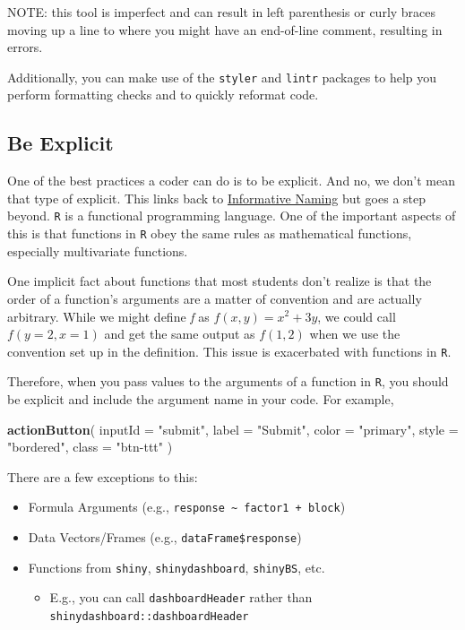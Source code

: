 \documentclass[
]{book}
\newenvironment{Shaded}{\begin{snugshade}}{\end{snugshade}}
\newcommand{\DataTypeTok}[1]{\textcolor[rgb]{0.13,0.29,0.53}{#1}}
\newcommand{\KeywordTok}[1]{\textcolor[rgb]{0.13,0.29,0.53}{\textbf{#1}}}
\newcommand{\NormalTok}[1]{#1}
\newcommand{\StringTok}[1]{\textcolor[rgb]{0.31,0.60,0.02}{#1}}
\providecommand{\tightlist}{%
  \setlength{\itemsep}{0pt}\setlength{\parskip}{0pt}}
\begin{document}
NOTE: this tool is imperfect and can result in left parenthesis or curly braces moving up a line to where you might have an end-of-line comment, resulting in errors.

Additionally, you can make use of the \texttt{styler} and \texttt{lintr} packages to help you perform formatting checks and to quickly reformat code.

\hypertarget{explicit}{%
\subsection{Be Explicit}\label{explicit}}

One of the best practices a coder can do is to be explicit. And no, we don't mean that type of explicit. This links back to \protect\hyperlink{naming}{Informative Naming} but goes a step beyond. \texttt{R} is a functional programming language. One of the important aspects of this is that functions in \texttt{R} obey the same rules as mathematical functions, especially multivariate functions.

One implicit fact about functions that most students don't realize is that the order of a function's arguments are a matter of convention and are actually arbitrary. While we might define \emph{f} as \(f(x,y) = x^2+3y\), we could call \(f(y=2,x=1)\) and get the same output as \(f(1,2)\) when we use the convention set up in the definition. This issue is exacerbated with functions in \texttt{R}.

Therefore, when you pass values to the arguments of a function in \texttt{R}, you should be explicit and include the argument name in your code. For example,

\begin{Shaded}
\begin{Highlighting}[]
\KeywordTok{actionButton}\NormalTok{(}
  \DataTypeTok{inputId =} \StringTok{"submit"}\NormalTok{,}
  \DataTypeTok{label =} \StringTok{"Submit"}\NormalTok{,}
  \DataTypeTok{color =} \StringTok{"primary"}\NormalTok{,}
  \DataTypeTok{style =} \StringTok{"bordered"}\NormalTok{,}
  \DataTypeTok{class =} \StringTok{"btn-ttt"}
\NormalTok{)}
\end{Highlighting}
\end{Shaded}

There are a few exceptions to this:

\begin{itemize}
\tightlist
\item
  Formula Arguments (e.g., \texttt{response\ \textasciitilde{}\ factor1\ +\ block})
\item
  Data Vectors/Frames (e.g., \texttt{dataFrame\$response})
\item
  Functions from \texttt{shiny}, \texttt{shinydashboard}, \texttt{shinyBS}, etc.

  \begin{itemize}
  \tightlist
  \item
    E.g., you can call \texttt{dashboardHeader} rather than \texttt{shinydashboard::dashboardHeader}
  \end{itemize}
\end{itemize}
\end{document}

